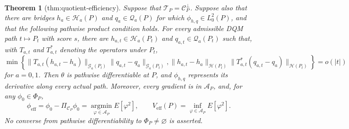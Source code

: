\documentclass{article}
\newtheorem{theorem}{Theorem}
\begin{document}
\begin{theorem}[thm:quotient-efficiency]\label{thm:quotient-efficiency}
Suppose that \(\mathcal T_P=\mathcal C_P^\perp\).  Suppose also that there are bridges \(h_a\in\mathcal H_a(P)\) and \(q_a\in\mathcal Q_a(P)\) for which \(\phi_{h,q}\in L_0^2(P)\), and that the following pathwise product condition holds.  For every admissible DQM path \(t\mapsto P_t\) with score \(s\), there are \(h_{a,t}\in\mathcal H_a(P_t)\) and \(q_{a,t}\in\mathcal Q_a(P_t)\) such that, with \(T_{a,t}\) and \(T_{a,t}^*\) denoting the operators under \(P_t\),
\[
 \min\!\left\{
 \|T_{a,t}(h_{a,t}-h_a)\|_{\mathcal G_a(P_t)}
 \|q_{a,t}-q_a\|_{\mathcal G_a(P_t)},
 \|h_{a,t}-h_a\|_{\mathcal H(P_t)}
 \|T_{a,t}^*(q_{a,t}-q_a)\|_{\mathcal H(P_t)}
 \right\}=o(|t|)
\]
for \(a=0,1\).  Then \(\theta\) is pathwise differentiable at \(P\), and \(\phi_{h,q}\) represents its derivative along every actual path.  Moreover, every gradient is in \(\mathcal A_P\), and, for any \(\phi_0\in\Phi_P\),
\[
 \phi_{\mathrm{eff}}
 =\phi_0-\Pi_{\mathcal C_P}\phi_0
 =\operatorname*{argmin}_{\varphi\in\mathcal A_P}E[\varphi^2],
 \qquad
 V_{\mathrm{eff}}(P)=\inf_{\varphi\in\mathcal A_P}E[\varphi^2].
\]
No converse from pathwise differentiability to \(\Phi_P\neq\varnothing\) is asserted.
\end{theorem}
\end{document}
